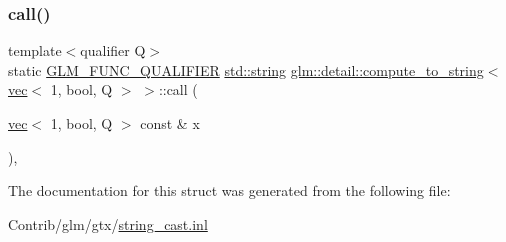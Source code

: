 \subsubsection{\texorpdfstring{call()}{call()}}
{\footnotesize\ttfamily template$<$qualifier Q$>$ \\
static \mbox{\hyperlink{setup_8hpp_a33fdea6f91c5f834105f7415e2a64407}{G\+L\+M\+\_\+\+F\+U\+N\+C\+\_\+\+Q\+U\+A\+L\+I\+F\+I\+ER}} \mbox{\hyperlink{_s_d_l__opengl__glext_8h_ae84541b4f3d8e1ea24ec0f466a8c568b}{std\+::string}} \mbox{\hyperlink{structglm_1_1detail_1_1compute__to__string}{glm\+::detail\+::compute\+\_\+to\+\_\+string}}$<$ \mbox{\hyperlink{structglm_1_1vec}{vec}}$<$ 1, bool, Q $>$ $>$\+::call (\begin{DoxyParamCaption}\item[{\mbox{\hyperlink{structglm_1_1vec}{vec}}$<$ 1, bool, Q $>$ const \&}]{x }\end{DoxyParamCaption})\hspace{0.3cm}{\ttfamily [inline]}, {\ttfamily [static]}}



The documentation for this struct was generated from the following file\+:\begin{DoxyCompactItemize}
\item 
Contrib/glm/gtx/\mbox{\hyperlink{string__cast_8inl}{string\+\_\+cast.\+inl}}\end{DoxyCompactItemize}
